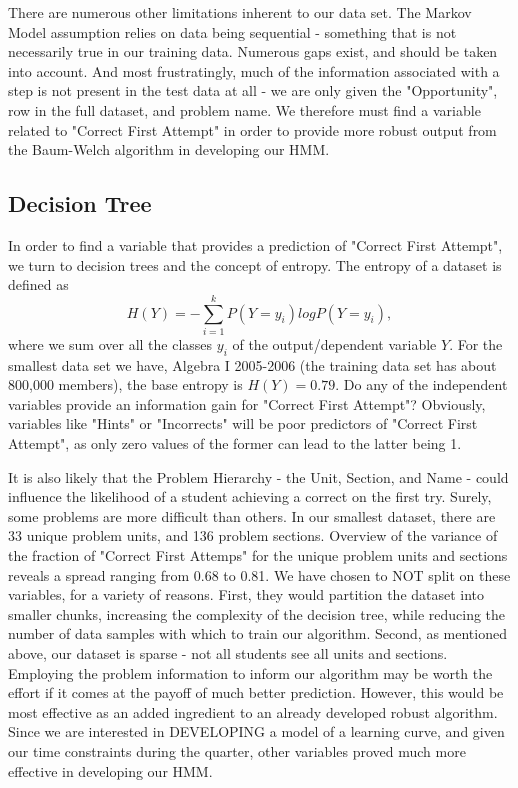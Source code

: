 \documentclass{article} %
\begin{document}
There are numerous other limitations inherent to our data set. The Markov Model assumption relies on data being sequential - something that is not necessarily true in our training data. Numerous gaps exist, and should be taken into account. And most frustratingly, much of the information associated with a step is not present in the test data at all - we are only given the "Opportunity", row in the full dataset, and problem name. We therefore must find a variable related to "Correct First Attempt" in order to provide more robust output from the Baum-Welch algorithm in developing our HMM.

\subsection{Decision Tree}
In order to find a variable that provides a prediction of "Correct First Attempt", we turn to decision trees and the concept of entropy. The entropy of a dataset is defined as
$$
H(Y) = -\sum_{i=1}^k P(Y = y_i) log P(Y = y_i),
$$
where we sum over all the classes $y_i$ of the output/dependent variable $Y$. For the smallest data set we have, Algebra I 2005-2006 (the training data set has about 800,000 members), the base entropy is $H(Y) = 0.79$. Do any of the independent variables provide an information gain for "Correct First Attempt"? Obviously, variables like "Hints" or "Incorrects" will be poor predictors of "Correct First Attempt", as only zero values of the former can lead to the latter being 1.

It is also likely that the Problem Hierarchy - the Unit, Section, and Name - could influence the likelihood of a student achieving a correct on the first try. Surely, some problems are more difficult than others. In our smallest dataset, there are 33 unique problem units, and 136 problem sections. Overview of the variance of the fraction of "Correct First Attemps" for the unique problem units and sections reveals a spread ranging from 0.68 to 0.81. We have chosen to NOT split on these variables, for a variety of reasons. First, they would partition the dataset into smaller chunks, increasing the complexity of the decision tree, while reducing the number of data samples with which to train our algorithm. Second, as mentioned above, our dataset is sparse - not all students see all units and sections. Employing the problem information to inform our algorithm may be worth the effort if it comes at the payoff of much better prediction. However, this would be most effective as an added ingredient to an already developed robust algorithm. Since we are interested in DEVELOPING a model of a learning curve, and given our time constraints during the quarter, other variables proved much more effective in developing our HMM.
\end{document}
